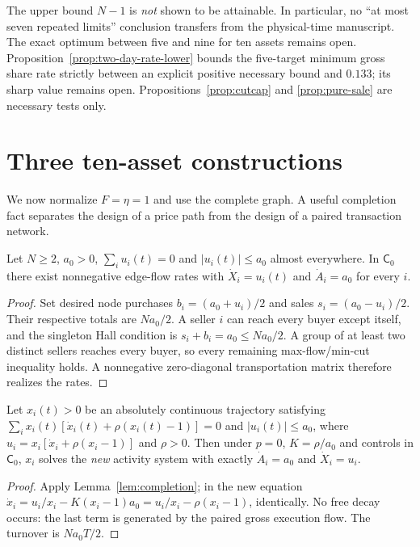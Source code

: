 \documentclass[review,hidelinks,onefignum,onetabnum]{siamonline250211}%
\begin{document}
The upper bound $N-1$ is \emph{not} shown to be attainable.
In particular, no ``at most seven repeated limits'' conclusion
transfers from the physical-time manuscript. The exact optimum
between five and nine for ten assets remains open.
Proposition~\ref{prop:two-day-rate-lower} bounds the
five-target minimum gross share rate strictly between
an explicit positive necessary bound and $0.133$;
its sharp value remains open. Propositions~\ref{prop:cutcap}
and \ref{prop:pure-sale} are necessary tests only.

\section{Three ten-asset constructions}\label{sec:examples}
We now normalize $F=\eta=1$ and use the complete graph. A useful
completion fact separates the design of a price path from the design
of a paired transaction network.
\begin{lemma}\label{lem:completion}
Let $N\ge2$, $a_0>0$, $\sum_iu_i(t)=0$ and
$|u_i(t)|\le a_0$ almost everywhere. In $\mathsf C_0$ there exist
nonnegative edge-flow rates with
$\dot X_i=u_i(t)$ and $\dot A_i=a_0$ for every $i$.
\end{lemma}
\begin{proof}
Set desired node purchases $b_i=(a_0+u_i)/2$ and sales
$s_i=(a_0-u_i)/2$. Their respective totals are $Na_0/2$.
A seller $i$ can reach every buyer except itself, and the singleton
Hall condition is $s_i+b_i=a_0\le Na_0/2$. A group of at least
two distinct sellers reaches every buyer, so every remaining
max-flow/min-cut inequality holds. A nonnegative zero-diagonal
transportation matrix therefore realizes the rates.
\end{proof}

\begin{lemma}\label{lem:embed}
Let $x_i(t)>0$ be an absolutely continuous trajectory satisfying
$\sum_i x_i(t)[\dot x_i(t)+\rho(x_i(t)-1)]=0$ and
$|u_i(t)|\le a_0$, where
$u_i=x_i[\dot x_i+\rho(x_i-1)]$ and $\rho>0$.
Then under $p=0$, $K=\rho/a_0$ and controls in $\mathsf C_0$,
$x_i$ solves the \emph{new} activity system with exactly
$\dot A_i=a_0$ and $\dot X_i=u_i$.
\end{lemma}
\begin{proof}
Apply Lemma~\ref{lem:completion}; in the new equation
$\dot x_i=u_i/x_i-K(x_i-1)a_0
=u_i/x_i-\rho(x_i-1)$, identically.
No free decay occurs: the last term is generated by the paired
gross execution flow. The turnover is $Na_0T/2$.
\end{proof}
\end{document}

